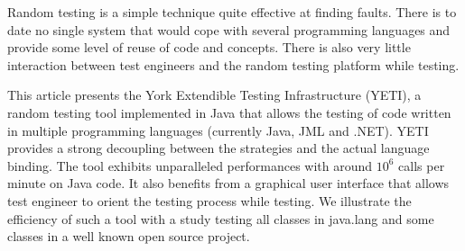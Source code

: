 Random testing is a simple technique quite effective at finding faults.
There is to date no single system that would cope with several programming languages and provide some level of reuse of code and concepts. There is also very little interaction between test engineers and the random testing platform while testing.

This article presents the York Extendible Testing Infrastructure (YETI), a random testing tool implemented in Java that allows the testing of code written in multiple programming languages (currently Java, JML and .NET). YETI provides a strong decoupling between the strategies and the actual language binding. The tool exhibits unparalleled performances with around $10^6$ calls per minute on Java code. It also benefits from a graphical user interface that allows test engineer to orient the testing process while testing. We illustrate the efficiency of such a tool  with a study testing all classes in java.lang and some classes in a well known open source project.
